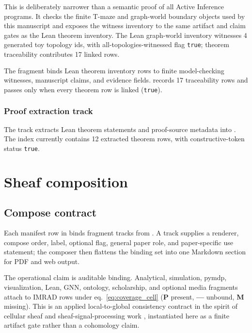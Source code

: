 \documentclass[
  english,
]{article}
\begin{document}
This is deliberately narrower than a semantic proof of all Active
Inference programs. It checks the finite T-maze and graph-world boundary
objects used by this manuscript and exposes the witness inventory to the
same artifact and claim gates as the Lean theorem inventory. The Lean
graph-world inventory witnesses 4 generated toy topology ids, with
all-topologies-witnessed flag \texttt{true}; theorem traceability
contributes 17 linked rows.

The  fragment binds Lean theorem inventory
rows to finite model-checking witnesses, manuscript claims, and evidence
fields.  records
17 traceability rows and passes only when every theorem row is linked
(\texttt{true}).

\subsubsection{Proof extraction track}\label{proof-extraction-track}

The  track extracts Lean theorem statements
and proof-source metadata into
. The index currently
contains 12 extracted theorem rows, with constructive-token status
\texttt{true}.

\newpage

\section{Sheaf composition}\label{sec:methods_sheaf}

\subsection{Compose contract}\label{compose-contract}

Each manifest row in  binds
fragment tracks from . A track
supplies a renderer, compose order, label, optional flag, general paper
role, and paper-specific use statement; the composer then flattens the
binding set into one Markdown section for PDF and web output.

The operational claim is auditable binding. Analytical, simulation,
pymdp, visualization, Lean, GNN, ontology, scholarship, and optional
media fragments attach to IMRAD rows under eq.~\ref{eq:coverage_cell}
(\textbf{P} present, \textbf{---} unbound, \textbf{M} missing). This is
an applied local-to-global consistency contract in the spirit of
cellular sheaf and sheaf-signal-processing work
\citep{curry2014sheaves, robinson2014topological}, instantiated here as
a finite artifact gate rather than a cohomology claim.
\end{document}
